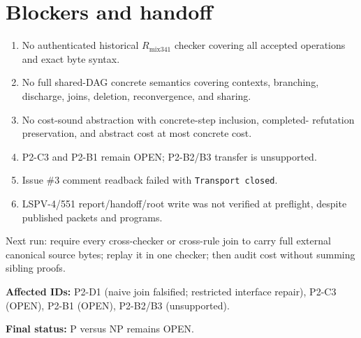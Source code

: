 \documentclass[11pt]{article}
\begin{document}
\section*{Blockers and handoff}
\begin{enumerate}
\item No authenticated historical \(R_{\mathrm{mix341}}\) checker covering
all accepted operations and exact byte syntax.
\item No full shared-DAG concrete semantics covering contexts, branching,
discharge, joins, deletion, reconvergence, and sharing.
\item No cost-sound abstraction with concrete-step inclusion, completed-
refutation preservation, and abstract cost at most concrete cost.
\item P2-C3 and P2-B1 remain OPEN; P2-B2/B3 transfer is unsupported.
\item Issue \#3 comment readback failed with \texttt{Transport closed}.
\item LSPV-4/551 report/handoff/root write was not verified at preflight,
despite published packets and programs.
\end{enumerate}
Next run: require every cross-checker or cross-rule join to carry full
external canonical source bytes; replay it in one checker; then audit cost
without summing sibling proofs.

\textbf{Affected IDs:} P2-D1 (naive join falsified; restricted interface
repair), P2-C3 (OPEN), P2-B1 (OPEN), P2-B2/B3 (unsupported).

\bigskip
\noindent\textbf{Final status:} P versus NP remains OPEN.

\end{document}
